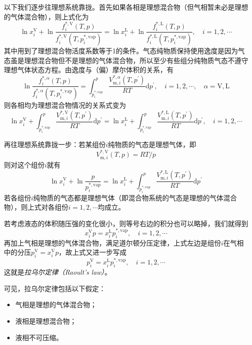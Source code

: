 \documentclass[main.tex]{subfiles}
\begin{document}
以下我们逐步往理想系统靠拢。首先如果各相是理想混合物（但气相暂未必是理想的气体混合物），则上式化为
\[\ln x_i^\text{V}+\ln\frac{f_i^{*,\text{V}}\left(T,p\right)}{f_i^{*,\text{V}}\left(T,p_i^{*,\text{vap}}\right)}=\ln x_i^\text{L}+\ln\frac{f_i^{*,\text{L}}\left(T,p\right)}{f_i^{*,\text{L}}\left(T,p_i^{*,\text{vap}}\right)},\quad i=1,2,\cdots\]
其中用到了理想混合物活度系数等于1的条件。气态纯物质保持使用逸度是因为气态虽是理想混合物但不是理想的气体混合物，所以至少有些组分纯物质气态不遵守理想气体状态方程。由逸度与（偏）摩尔体积的关系，有
\[\ln\frac{f_i^{*,\alpha}\left(T,p\right)}{f_i^{*,\alpha}\left(T,p_i^{*,\text{vap}}\right)}=\int_{p_i^{*,\text{vap}}}^p\frac{V_{\text{m},i}^{*,\alpha}\left(T,p^\prime\right)}{RT}\mathrm{d}p^\prime,\quad i=1,2,\cdots,\quad \alpha=\text{V},\text{L}\]
则各相均为理想混合物情况的关系式变为
\[\ln x_i^\text{V}+\int_{p_i^{*,\text{vap}}}^{p}\frac{V_{\text{m},i}^{*,\text{V}}\left(T,p^\prime\right)}{RT}\mathrm{d}p^\prime=\ln x_i^\text{L}+\int_{p_i^{*,\text{vap}}}^{p}\frac{V_{\text{m},i}^{*,\text{L}}\left(T,p^\prime\right)}{RT}\mathrm{d}p^\prime,\quad i=1,2,\cdots\]

再往理想系统靠拢一步：若某组份$i$纯物质的气态是理想气体，即
\[V_{\text{m},i}^{*,\text{V}}\left(T,p\right)=RT/p\]
则对这个组份$i$就有
\[\ln x_i^\text{V}+\ln\frac{p}{p_i^{*,\text{vap}}}=\ln x_i^\text{L}+\int_{p_i^{*,\text{vap}}}^{p}\frac{V_{\text{m},i}^{*,\text{L}}\left(T,p^\prime\right)}{RT}\mathrm{d}p^\prime \]
若各组份$i$纯物质的气态都是理想气体（即混合物系统的气态是理想的气体混合物），则上式对各组份$i=1,2,\cdots$均成立。

若考虑液态的体积随压强的变化很小，则等号右边的积分也可以略掉，我们就得到
\[x_i^\text{V}p=x_i^\text{L}p_i^{*,\text{vap}},\quad i=1,2,\cdots\]
再加上气相是理想的气体混合物，满足道尔顿分压定律，上式左边是组份$i$在气相中的分压$p^\text{V}_i=x_i^\text{V}p$，故上式又进一步写成
\[p_i^\text{V}=x_i^\text{L}p_i^{*,\text{vap}},\quad i=1,2,\cdots\]
这就是\emph{拉乌尔定律（Raoult's law）}。

可见，拉乌尔定律包括以下假定：
\begin{itemize}
  \item 气相是理想的气体混合物；
  \item 液相是理想混合物；
  \item 液相不可压缩。
\end{itemize}
\end{document}
